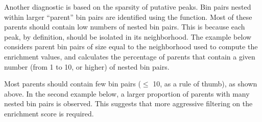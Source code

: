 \documentclass{report}\usepackage[]{graphicx}\usepackage[usenames,dvipsnames]{color}
\newcommand{\hlnum}[1]{\textcolor[rgb]{0.816,0.125,0.439}{#1}}%
\newcommand{\hlstr}[1]{\textcolor[rgb]{0.251,0.627,0.251}{#1}}%
\newcommand{\hlcom}[1]{\textcolor[rgb]{0.502,0.502,0.502}{\textit{#1}}}%
\newcommand{\hlopt}[1]{\textcolor[rgb]{0,0,0}{#1}}%
\newcommand{\hlstd}[1]{\textcolor[rgb]{0.251,0.251,0.251}{#1}}%
\newcommand{\hlkwb}[1]{\textcolor[rgb]{0,0,0}{#1}}%
\newcommand{\hlkwc}[1]{\textcolor[rgb]{0.251,0.251,0.251}{#1}}%
\newcommand{\hlkwd}[1]{\textcolor[rgb]{0.878,0.439,0.125}{#1}}%
\newenvironment{knitrout}{}{} %
\begin{document}
Another diagnostic is based on the sparsity of putative peaks.
Bin pairs nested within larger ``parent'' bin pairs are identified using the  function.
Most of these parents should contain low numbers of nested bin pairs.
This is because each peak, by definition, should be isolated in its neighborhood.
The example below considers parent bin pairs of size equal to the neighborhood used to compute the enrichment values,
and calculates the percentage of parents that contain a given number (from 1 to 10, or higher) of nested bin pairs.

\begin{knitrout}
\color{fgcolor}
\end{knitrout}

Most parents should contain few bin pairs ($\le$ 10, as a rule of thumb), as shown above.
In the second example below, a larger proportion of parents with many nested bin pairs is observed.
This suggests that more aggressive filtering on the enrichment score is required.
\end{document}
